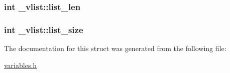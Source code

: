 \subsubsection[{\texorpdfstring{list\+\_\+len}{list_len}}]{\setlength{\rightskip}{0pt plus 5cm}int \+\_\+vlist\+::list\+\_\+len}\hypertarget{struct__vlist_a2e7e3bd943f8651f699c1d724efcb3db}{}\label{struct__vlist_a2e7e3bd943f8651f699c1d724efcb3db}
\subsubsection[{\texorpdfstring{list\+\_\+size}{list_size}}]{\setlength{\rightskip}{0pt plus 5cm}int \+\_\+vlist\+::list\+\_\+size}\hypertarget{struct__vlist_ac99f755431acd1c5d178f3220ac41524}{}\label{struct__vlist_ac99f755431acd1c5d178f3220ac41524}


The documentation for this struct was generated from the following file\+:\begin{DoxyCompactItemize}
\item 
\hyperlink{variables_8h}{variables.\+h}\end{DoxyCompactItemize}

